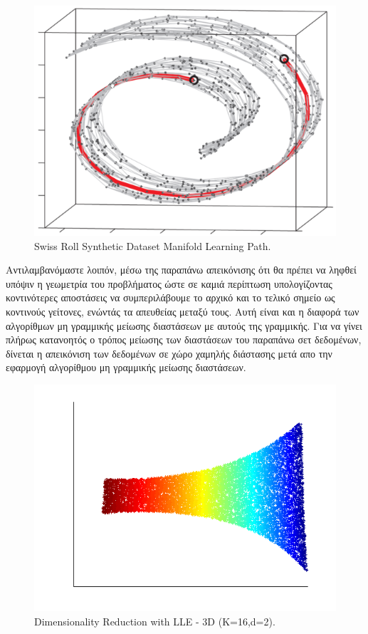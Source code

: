 \par
\begin{figure}[h!]
\centering
\includegraphics[scale=0.5]{figs/3.png}
\newline
\caption{\textlatin{Swiss Roll Synthetic Dataset Manifold Learning Path.}} 
\end{figure}
\par
\vspace*{2cm}
Αντιλαμβανόμαστε λοιπόν, μέσω της παραπάνω απεικόνισης ότι θα πρέπει να ληφθεί υπόψιν η γεωμετρία του προβλήματος ώστε σε καμιά περίπτωση υπολογίζοντας κοντινότερες αποστάσεις να συμπεριλάβουμε το αρχικό και το τελικό σημείο ως κοντινούς γείτονες, ενώντάς τα απευθείας μεταξύ τους. Αυτή είναι και η διαφορά των αλγορίθμων μη γραμμικής μείωσης διαστάσεων με αυτούς της γραμμικής. Για να γίνει πλήρως κατανοητός ο τρόπος μείωσης των διαστάσεων του παραπάνω σετ δεδομένων, δίνεται η απεικόνιση των δεδομένων σε χώρο χαμηλής διάστασης μετά απο την εφαρμογή αλγορίθμου μη γραμμικής μείωσης διαστάσεων.
\clearpage
\begin{figure}[t]
\centering
\includegraphics[scale=0.8]{figs/4.png}
\newline
\caption{\textlatin{Dimensionality Reduction with LLE - 3D (K=16,d=2).}} 
\end{figure}
